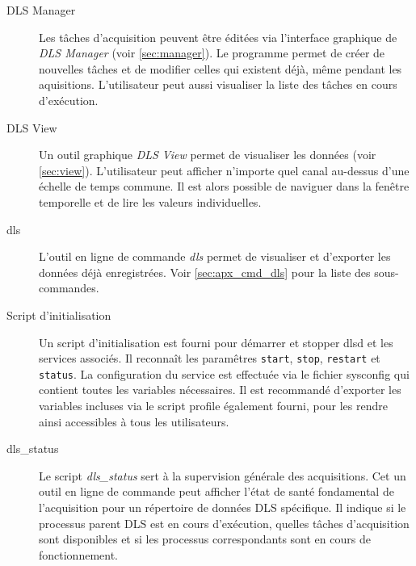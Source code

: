 \documentclass[a4paper,12pt,BCOR6mm,bibtotoc,idxtotoc]{scrbook}
\begin{document}
\begin{description}

\item[DLS Manager] Les t\^aches d'acquisition
  peuvent \^etre \'edit\'ees via l'interface graphique de \textit{DLS
    Manager} (voir \autoref{sec:manager}). Le programme permet de
  cr\'eer de nouvelles t\^aches et de modifier celles qui existent
  d\'ej\`a, m\^eme pendant les aquisitions.  L'utilisateur peut aussi
  visualiser la liste des t\^aches en cours d'ex\'ecution.

\item[DLS View] Un outil graphique \textit{DLS View}
  permet de visualiser les donn\'ees (voir
  \autoref{sec:view}). L'utilisateur peut afficher n'importe quel
  canal au-dessus d'une \'echelle de temps commune. Il est alors
  possible de naviguer dans la fen\^etre temporelle et de lire les
  valeurs individuelles.

\item[dls] L'outil en ligne de commande \textit{dls}
  permet de visualiser et d'exporter les donn\'ees d\'ej\`a enregistr\'ees.
  Voir \autoref{sec:apx_cmd_dls} pour la liste des sous-commandes.

\item[Script d'initialisation] Un script
  d'initialisation est fourni pour d\'emarrer et stopper dlsd et les
  services associ\'es.  Il reconna\^it les param\^etres
  \texttt{start}, \texttt{stop}, \texttt{restart} et
  \texttt{status}. La configuration du service est effectu\'ee via le
  fichier sysconfig qui contient toutes les
  variables n\'ecessaires.  Il est recommand\'e d'exporter les
  variables incluses via le script profile \'egalement fourni, pour
  les rendre ainsi accessibles \`a tous les utilisateurs.

\item[dls\_status] Le script \textit{dls\_\-status}
  sert \`a la supervision g\'en\'erale des acquisitions. Cet un outil
  en ligne de commande peut afficher l'\'etat de sant\'e fondamental
  de l'acquisition pour un r\'epertoire de donn\'ees DLS sp\'ecifique.
  Il indique si le processus parent DLS est en cours d'ex\'ecution,
  quelles t\^aches d'acquisition sont disponibles et si les processus
  correspondants sont en cours de fonctionnement.

\end{description}

\end{document}
